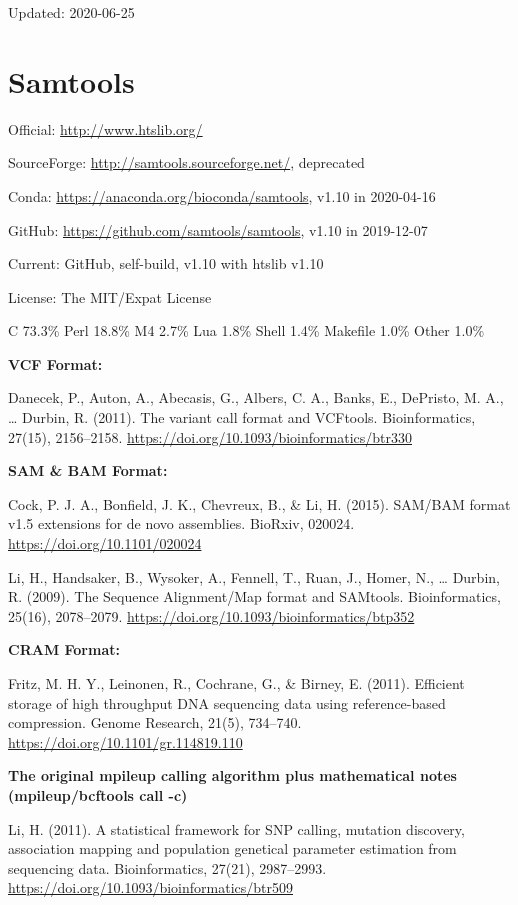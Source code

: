 \documentclass[]{article}
\begin{document}
Updated: 2020-06-25

\section{Samtools}

Official: \url{http://www.htslib.org/}

SourceForge: \url{http://samtools.sourceforge.net/}, deprecated

Conda: \url{https://anaconda.org/bioconda/samtools}, v1.10 in 2020-04-16

GitHub: \url{https://github.com/samtools/samtools}, v1.10 in 2019-12-07

Current: GitHub, self-build, v1.10 with htslib v1.10

License: The MIT/Expat License

C 73.3\% Perl 18.8\% M4 2.7\% Lua 1.8\% Shell 1.4\% Makefile 1.0\% Other 1.0\%

\textbf{VCF Format:}

Danecek, P., Auton, A., Abecasis, G., Albers, C. A., Banks, E., DePristo, M. A., … Durbin, R. (2011). The variant call format and VCFtools. Bioinformatics, 27(15), 2156–2158. \url{https://doi.org/10.1093/bioinformatics/btr330}

\textbf{SAM \& BAM Format:}

Cock, P. J. A., Bonfield, J. K., Chevreux, B., \& Li, H. (2015). SAM/BAM format v1.5 extensions for de novo assemblies. BioRxiv, 020024. \url{https://doi.org/10.1101/020024}

Li, H., Handsaker, B., Wysoker, A., Fennell, T., Ruan, J., Homer, N., … Durbin, R. (2009). The Sequence Alignment/Map format and SAMtools. Bioinformatics, 25(16), 2078–2079. \url{https://doi.org/10.1093/bioinformatics/btp352}

\textbf{CRAM Format:}

Fritz, M. H. Y., Leinonen, R., Cochrane, G., \& Birney, E. (2011). Efficient storage of high throughput DNA sequencing data using reference-based compression. Genome Research, 21(5), 734–740. \url{https://doi.org/10.1101/gr.114819.110}

\textbf{The original mpileup calling algorithm plus mathematical notes (mpileup/bcftools call -c)}

Li, H. (2011). A statistical framework for SNP calling, mutation discovery, association mapping and population genetical parameter estimation from sequencing data. Bioinformatics, 27(21), 2987–2993. \url{https://doi.org/10.1093/bioinformatics/btr509}
\end{document}
